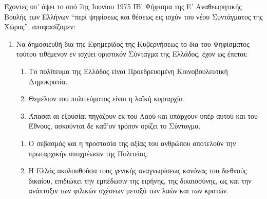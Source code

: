 \documentclass[twoside, a4paper, 10pt]{article}
\begin{document}

\begin{multicols}{2}


Έχοντες υπ' όψει το από 7ης Ιουνίου 1975 ΙΒ' Ψήφισμα της Ε' Αναθεωρητικής Βουλής των Ελλήνων “περί ψηφίσεως και θέσεως εις ισχύν του νέου Συντάγματος της Χώρας”, αποφασίζομεν:

\begin{enumerate}
\item[Α.] Να δημοσιευθή δια της Εφημερίδος της Κυβερνήσεως το δια του Ψηφίσματος τούτου τιθέμενον εν ισχύει οριστικόν Σύνταγμα της Ελλάδος, έχον ως έπεται:

\begin{BigQuote}


\begin{enumerate}
  \item[1.] Το πολίτευμα της Ελλάδος είναι Προεδρευομένη Κοινοβουλευτική Δημοκρατία.
  \item[2.] Θεμέλιον του πολιτεύματος είναι η λαϊκή κυριαρχία.
  \item[3.] Άπασαι αι εξουσίαι πηγάζουν εκ του Λαού και υπάρχουν υπέρ αυτού και του Έθνους, ασκούνται δε καθ'ον τρόπον ορίζει το Σύνταγμα.
\end{enumerate}

\begin{enumerate}
  \item[1.] Ο σεβασμός και η προστασία της αξίας του ανθρώπου αποτελούν την πρωταρχικήν υποχρέωσιν της Πολιτείας.
  \item[2.] Η Ελλάς ακολουθούσα τους γενικής αναγνωρίσεως κανόνας του διεθνούς δικαίου, επιδιώκει την εμπέδωσιν της ειρήνης, της δικαιοσύνης, ως και την ανάπτυξιν των φιλικών σχέσεων μεταξύ των λαών και των κρατών.
\end{enumerate}


\end{BigQuote}
\end{enumerate}
\end{multicols}
\end{document}
